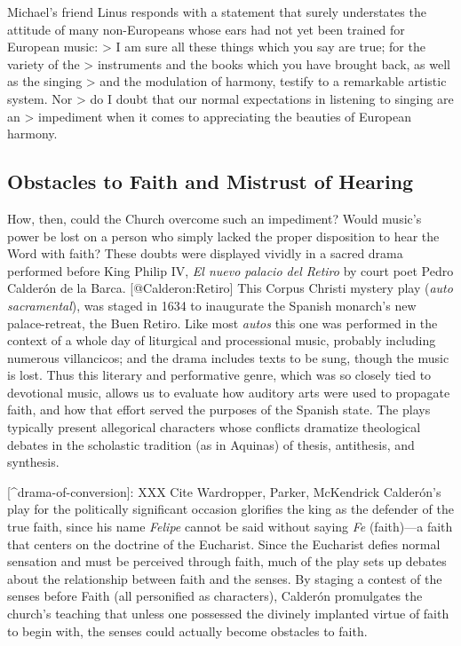 Michael's friend Linus responds with a statement that surely understates the attitude of many non-Europeans whose ears had not yet been trained for European music:
> I am sure all these things which you say are true; for the variety of the > instruments and the books which you have brought back, as well as the singing > and the modulation of harmony, testify to a remarkable artistic system. Nor > do I doubt that our normal expectations in listening to singing are an > impediment when it comes to appreciating the beauties of European harmony.
\Autocite[156]{Massarella:JapaneseTravellers}


\subsection{Obstacles to Faith and Mistrust of Hearing}


How, then, could the Church overcome such an impediment?  Would music's power be lost on a person who simply lacked the proper disposition to hear the Word with faith?  These doubts were displayed vividly in a sacred drama performed before King Philip IV, \emph{El nuevo palacio del Retiro} by court poet Pedro Calderón de la Barca.
[@Calderon:Retiro]
This Corpus Christi mystery play (\emph{auto sacramental}), was staged in 1634 to inaugurate the Spanish monarch's new palace-retreat, the Buen Retiro.
Like most \emph{autos} this one was performed in the context of a whole day of liturgical and processional music, probably including numerous villancicos; and the drama includes texts to be sung, though the music is lost.
Thus this literary and performative genre, which was so closely tied to devotional music, allows us to evaluate how auditory arts were used to propagate faith, and how that effort served the purposes of the Spanish state.
The plays typically present allegorical characters whose conflicts dramatize theological debates in the scholastic tradition (as in Aquinas) of thesis, antithesis, and synthesis.

[^drama-of-conversion]: \emph{}XXX\emph{} Cite Wardropper, Parker, McKendrick
Calderón's play for the politically significant occasion glorifies the king as the defender of the true faith, since his name \emph{Felipe} cannot be said without saying \emph{Fe} (faith)---a faith that centers on the doctrine of the Eucharist.
\Autocite[ll. XXX]{Calderon:Retiro}
Since the Eucharist defies normal sensation and must be perceived through faith, much of the play sets up debates about the relationship between faith and the senses.
By staging a contest of the senses before Faith (all personified as characters), Calderón promulgates the church's teaching that unless one possessed the divinely implanted virtue of faith to begin with, the senses could actually become obstacles to faith.


